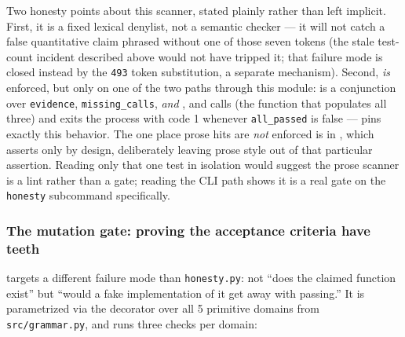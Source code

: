 \documentclass[
]{article}
\begin{document}
Two honesty points about this scanner, stated plainly rather than left
implicit. First, it is a fixed lexical denylist, not a semantic checker
--- it will not catch a false quantitative claim phrased without one of
those seven tokens (the stale test-count incident described above would
not have tripped it; that failure mode is closed instead by the
\texttt{493} token substitution, a separate mechanism). Second,
 \emph{is} enforced, but only on one of the
two paths through this module:  is a
conjunction over \texttt{evidence}, \texttt{missing\_calls}, \emph{and}
, and 
calls  (the function that populates all three)
and exits the process with code 1 whenever \texttt{all\_passed} is false
---  pins
exactly this behavior. The one place prose hits are \emph{not} enforced
is  in
, which asserts only
 by design, deliberately leaving prose
style out of that particular assertion. Reading only that one test in
isolation would suggest the prose scanner is a lint rather than a gate;
reading the CLI path shows it is a real gate on the \texttt{honesty}
subcommand specifically.

\subsubsection{The mutation gate: proving the acceptance criteria have
teeth}\label{the-mutation-gate-proving-the-acceptance-criteria-have-teeth}

 targets a different failure mode than
\texttt{honesty.py}: not ``does the claimed function exist'' but ``would
a fake implementation of it get away with passing.'' It is parametrized
via the
decorator over all 5 primitive domains from \texttt{src/grammar.py}, and
runs three checks per domain:
\end{document}
